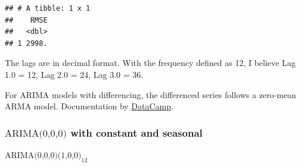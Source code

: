 \documentclass[
]{article}
\newenvironment{Shaded}{\begin{snugshade}}{\end{snugshade}}
\newcommand{\AttributeTok}[1]{\textcolor[rgb]{0.77,0.63,0.00}{#1}}
\newcommand{\CommentTok}[1]{\textcolor[rgb]{0.56,0.35,0.01}{\textit{#1}}}
\newcommand{\DecValTok}[1]{\textcolor[rgb]{0.00,0.00,0.81}{#1}}
\newcommand{\FunctionTok}[1]{\textcolor[rgb]{0.00,0.00,0.00}{#1}}
\newcommand{\NormalTok}[1]{#1}
\newcommand{\OtherTok}[1]{\textcolor[rgb]{0.56,0.35,0.01}{#1}}
\newcommand{\SpecialCharTok}[1]{\textcolor[rgb]{0.00,0.00,0.00}{#1}}
\begin{document}
\begin{verbatim}
## # A tibble: 1 x 1
##    RMSE
##   <dbl>
## 1 2998.
\end{verbatim}

The lags are in decimal format. With the frequency defined as 12, I
believe Lag 1.0 = 12, Lag 2.0 = 24, Lag 3.0 = 36.

For ARIMA models with differencing, the differenced series follows a
zero-mean ARMA model. Documentation by
\href{https://www.rdocumentation.org/packages/stats/versions/3.6.2/topics/arima}{DataCamp}.

\hypertarget{textarima000-with-constant-and-seasonal}{%
\subsubsection{\texorpdfstring{\(\text{ARIMA(0,0,0)}\) with constant and
seasonal}{\textbackslash text\{ARIMA(0,0,0)\} with constant and seasonal}}\label{textarima000-with-constant-and-seasonal}}

\(\text{ARIMA(0,0,0)(1,0,0)}_{12}\)

\begin{Shaded}
\end{Shaded}
\end{document}
